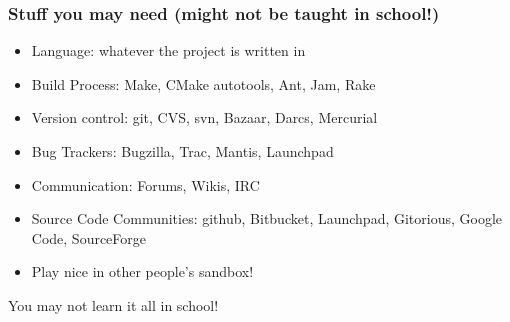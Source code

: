 \documentclass{beamer}
\begin{document}




\begin{frame}
  \frametitle{Stuff you may need (might not be taught in school!)}
    \begin{itemize}
    \item Language: whatever the project is written in
    \item Build Process: Make, CMake autotools, Ant, Jam, Rake
    \item Version control: git, CVS, svn, Bazaar, Darcs, Mercurial
    \item Bug Trackers: Bugzilla, Trac, Mantis, Launchpad
    \item Communication: Forums, Wikis, IRC
    \item Source Code Communities: github, Bitbucket, Launchpad,
      Gitorious, Google Code, SourceForge
    \item Play nice in other people's sandbox!
    \end{itemize}
    
    \begin{center}
      You may not learn it all in school!
    \end{center}
\end{frame}
\end{document}

